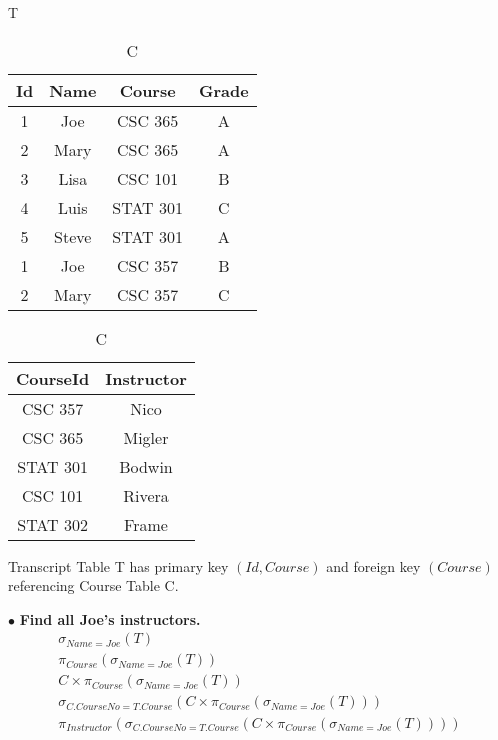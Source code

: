 \documentclass[twoside]{article}
\begin{document}
\begin{table}[!htb]
    \begin{minipage}{.5\linewidth}
      \caption{T}
      \centering
        \begin{tabular}{c|c|c|c}
            Id & Name & Course & Grade \\
            \hline
            1 & Joe & CSC 365 & A \\
            2 & Mary & CSC 365 & A \\
            3 & Lisa & CSC 101 & B \\
            4 & Luis & STAT 301 & C \\
            5 & Steve & STAT 301 & A \\
            1 & Joe & CSC 357 & B \\
            2 & Mary & CSC 357 & C \\
        \end{tabular}
    \end{minipage}
    \begin{minipage}{.25\linewidth}
      \centering
        \caption{C}
        \begin{tabular}{c|c}
            CourseId & Instructor \\
            \hline
            CSC 357 & Nico \\
            CSC 365 & Migler \\
            STAT 301 & Bodwin \\
            CSC 101 & Rivera \\
            STAT 302 & Frame \\
        \end{tabular}
    \end{minipage} 
\end{table}

Transcript Table T has primary key $(Id, Course)$ and foreign key $(Course)$ 
referencing Course Table C.

$\bullet$ \textbf{Find all Joe's instructors.}
\begin{gather*}
    \sigma_{Name=Joe}(T) \\
    \pi_{Course}(\sigma_{Name=Joe}(T)) \\
    C \times \pi_{Course}(\sigma_{Name=Joe}(T)) \\
    \sigma_{C.CourseNo=T.Course}(C \times \pi_{Course}(\sigma_{Name=Joe}(T))) \\
    \pi_{Instructor}(\sigma_{C.CourseNo=T.Course}(C 
    \times \pi_{Course}(\sigma_{Name=Joe}(T)))) \\
\end{gather*}
\end{document}
